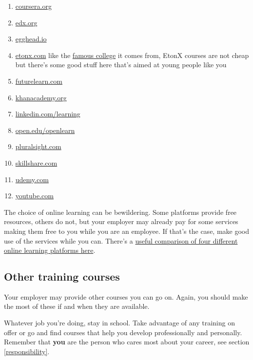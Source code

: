 \documentclass[
]{book}
\providecommand{\tightlist}{%
  \setlength{\itemsep}{0pt}\setlength{\parskip}{0pt}}
\begin{document}
\begin{enumerate}
\def\labelenumi{\arabic{enumi}.}
\tightlist
\item
  \href{https://www.coursera.org}{coursera.org}
\item
  \href{https://www.edx.org}{edx.org}
\item
  \href{https://egghead.io}{egghead.io}
\item
  \href{https://etonx.com}{etonx.com} like the \href{https://en.wikipedia.org/wiki/Eton_College}{famous college} it comes from, EtonX courses are not cheap but there's some good stuff here that's aimed at young people like you
\item
  \href{https://www.futurelearn.com}{futurelearn.com}
\item
  \href{https://www.khanacademy.org}{khanacademy.org}
\item
  \href{https://www.linkedin.com/learning}{linkedin.com/learning}
\item
  \href{https://www.open.edu/openlearn}{open.edu/openlearn}
\item
  \href{https://www.pluralsight.com}{pluralsight.com}
\item
  \href{https://www.skillshare.com}{skillshare.com}
\item
  \href{https://www.udemy.com}{udemy.com}
\item
  \href{https://www.youtube.com}{youtube.com}
\end{enumerate}

The choice of online learning can be bewildering. Some platforms provide free resources, others do not, but your employer may already pay for some services making them free to you while you are an employee. If that's the case, make good use of the services while you can. There's a \href{https://www.businessinsider.com/online-learning-platform-comparison-udemy-skillshare-lynda-coursera}{useful comparison of four different online learning platforms here}. \citep{udemy}

\hypertarget{othertrain}{%
\subsection{Other training courses}\label{othertrain}}

Your employer may provide other courses you can go on. Again, you should make the most of these if and when they are available.

Whatever job you're doing, stay in school. Take advantage of any training on offer or go and find courses that help you develop professionally and personally. Remember that \textbf{you} are the person who cares most about your career, see section \ref{responsibility}.
\end{document}

